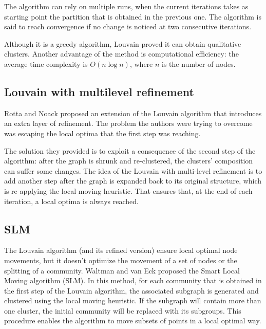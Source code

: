 The algorithm can rely on multiple runs, when the current iterations takes as starting point the partition that is obtained in the previous one. The algorithm is said to reach convergence if no change is noticed at two consecutive iterations.

Although it is a greedy algorithm, Louvain proved it can obtain qualitative clusters. Another advantage of the method is computational efficiency: the average time complexity is $O(n \log n)$, where $n$ is the number of nodes.


\subsection{Louvain with multilevel refinement}
Rotta and Noack \cite{Rotta2011} proposed an extension of the Louvain algorithm that introduces an extra layer of refinement. The problem the authors were trying to overcome was escaping the local optima that the first step was reaching. 

The solution they provided is to exploit a consequence of the second step of the algorithm: after the graph is shrunk and re-clustered, the clusters' composition can suffer some changes. The idea of the Louvain with multi-level refinement is to add another step after the graph is expanded back to its original structure, which is re-applying the local moving heuristic. That ensures that, at the end of each iteration, a local optima is always reached.

\subsection{SLM}
The Louvain algorithm (and its refined version) ensure local optimal node movements, but it doesn't optimize the movement of a set of nodes or the splitting of a community. Waltman and van Eck \cite{Waltman2013} proposed the Smart Local Moving algorithm (SLM). In this method, for each community that is obtained in the first step of the Louvain algorithm, the associated subgraph is generated and clustered using the local moving heuristic. If the subgraph will contain more than one cluster, the initial community will be replaced with its subgroups. This procedure enables the algorithm to move subsets of points in a local optimal way. 

